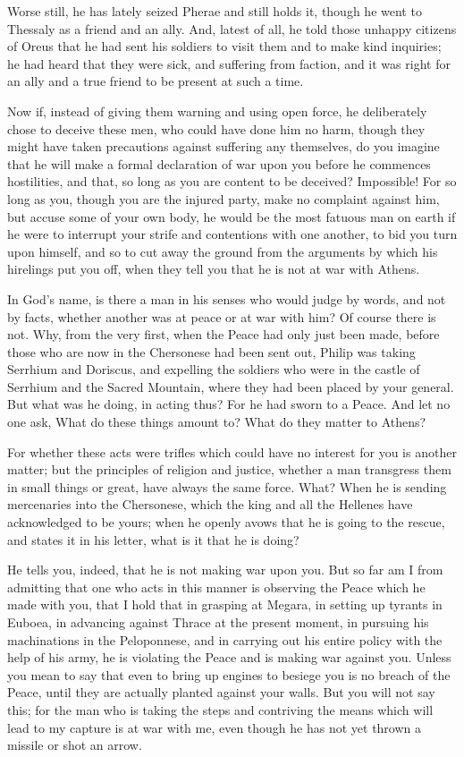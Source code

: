 \documentclass[a4paper]{amsbook}
\begin{document}
Worse still, he has lately seized Pherae and still holds it, though he went to Thessaly as a friend and an ally. And, latest of all, he told those unhappy citizens of Oreus that he had sent his soldiers to visit them and to make kind inquiries; he had heard that they were sick, and suffering from faction, and it was right for an ally and a true friend to be present at such a time.

Now if, instead of giving them warning and using open force, he deliberately chose to deceive these men, who could have done him no harm, though they might have taken precautions against suffering any themselves, do you imagine that he will make a formal declaration of war upon you before he commences hostilities, and that, so long as you are content to be deceived? Impossible! For so long as you, though you are the injured party, make no complaint against him, but accuse some of your own body, he would be the most fatuous man on earth if he were to interrupt your strife and contentions with one another, to bid you turn upon himself, and so to cut away the ground from the arguments by which his hirelings put you off, when they tell you that he is not at war with Athens.

In God's name, is there a man in his senses who would judge by words, and not by facts, whether another was at peace or at war with him? Of course there is not. Why, from the very first, when the Peace had only just been made, before those who are now in the Chersonese had been sent out, Philip was taking Serrhium and Doriscus, and expelling the soldiers who were in the castle of Serrhium and the Sacred Mountain, where they had been placed by your general. But what was he doing, in acting thus? For he had sworn to a Peace. And let no one ask, What do these things amount to? What do they matter to Athens?

For whether these acts were trifles which could have no interest for you is another matter; but the principles of religion and justice, whether a man transgress them in small things or great, have always the same force. What? When he is sending mercenaries into the Chersonese, which the king and all the Hellenes have acknowledged to be yours; when he openly avows that he is going to the rescue, and states it in his letter, what is it that he is doing?

He tells you, indeed, that he is not making war upon you. But so far am I from admitting that one who acts in this manner is observing the Peace which he made with you, that I hold that in grasping at Megara, in setting up tyrants in Euboea, in advancing against Thrace at the present moment, in pursuing his machinations in the Peloponnese, and in carrying out his entire policy with the help of his army, he is violating the Peace and is making war against you. Unless you mean to say that even to bring up engines to besiege you is no breach of the Peace, until they are actually planted against your walls. But you will not say this; for the man who is taking the steps and contriving the means which will lead to my capture is at war with me, even though he has not yet thrown a missile or shot an arrow.
\end{document}
